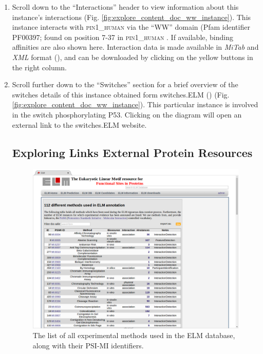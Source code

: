 \documentclass[12pt]{article}
\newcommand\uniprot[1]{%
	\textsc{\lowercase{#1}}%
}
\newcommand\fileformat[1]{%
    \textit{#1}{}%
}%
\begin{document}
\begin{enumerate}
\item Scroll down to the ``Interactions'' header to view information about this
	instance's interactions
	(Fig.  \ref{fig:explore_content_doc_ww_instance}). This instance
	interacts with \uniprot{PIN1\_Human} via the ``WW'' domain (Pfam identifier
	PF00397; found on position 7-37 in \uniprot{PIN1\_Human}. If available,
	binding affinities are also shown here. Interaction data is made
	available in \fileformat{MiTab} and \fileformat{XML} format
	(\cite{17925023}), and can be downloaded by clicking on the yellow
	buttons in the right column.

\item Scroll further down to the ``Switches'' section for a brief overview of
	the switches details of this instance obtained form switches.ELM
	(\cite{23550212}) (Fig. \ref{fig:explore_content_doc_ww_instance}). This
	particular instance is involved in the switch phosphorylating P53.
	Clicking on the diagram will open an external link to the
	switches.ELM website.

%
%
\subsection*{Exploring Links External Protein Resources}
\label{subsec:explore_content_links_to_external_resources}

\begin{figure}[h!]
	\centering
	\includegraphics[width=\textwidth]{Figures/explore_content/methods.png} 
	\caption{
		The list of all experimental methods used in the ELM database,
		along with their PSI-MI identifiers.
	}
	\label{fig:explore_content_methods}
\end{figure}


\end{enumerate}
\end{document}
